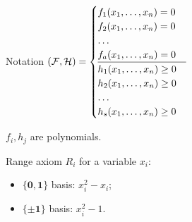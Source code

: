 \begin{frame}{Notation}
    $(\mathcal{F}, \mathcal{H}) =
    \begin{cases}
        f_1(x_1, \dots, x_n) = 0 \\
        f_2(x_1, \dots, x_n) = 0 \\
        \dots \\
        f_a(x_1, \dots, x_n) = 0 \\
        \hline
        h_1(x_1, \dots, x_n) \ge 0 \\
        h_2(x_1, \dots, x_n) \ge 0 \\
        \dots \\
        h_s(x_1, \dots, x_n) \ge 0 \\
    \end{cases}
    $

    \vspace{0.1cm}
    $f_i, h_j$ are polynomials.

    \vspace{0.1cm}
    \pause

    \begin{block}{Range axiom $R_i$ for a variable $x_i$:}
        \begin{itemize}
            \item $\mathbf{\{0, 1\}}$ basis: $x_i^2 - x_i$;
            \item $\mathbf{\{\pm 1\}}$ basis: $x_i^2 - 1$.
        \end{itemize}
    \end{block}

   
\end{frame}


